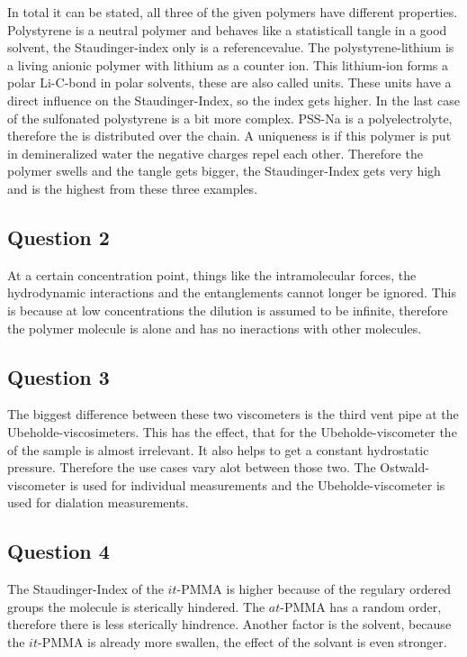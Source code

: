 \documentclass[10pt,a4paper,ngerman]{scrartcl}
\begin{document}
			In total it can be stated, all three of the given polymers have different properties.
			Polystyrene is a neutral polymer and behaves like a statisticall tangle in a good solvent, the Staudinger-index
			only is a referencevalue. The polystyrene-lithium is a living anionic polymer with lithium as a counter ion.
			This lithium-ion forms a polar Li-C-bond in polar solvents, these are also called units.
			These units have a direct influence on the Staudinger-Index, so the index gets higher.
			In the last case of the sulfonated polystyrene is a bit more complex. 
			PSS-Na is a polyelectrolyte, therefore the  is distributed over the chain. 
			A uniqueness is if this polymer is put in demineralized water the negative charges repel each other.
			Therefore the polymer swells and the tangle gets bigger, the Staudinger-Index gets very high and is the highest from these three examples.


		\subsection{Question 2}

			At a certain concentration point, things like the intramolecular forces, the hydrodynamic interactions and the entanglements cannot longer be ignored.
			This is because at low concentrations the dilution is assumed to be infinite, therefore the polymer molecule is alone and has no ineractions with other molecules.


		\subsection{Question 3}

			The biggest difference between these two viscometers is the third vent pipe at the Ubeholde-viscosimeters.
			This has the effect, that for the Ubeholde-viscometer the  of the sample is almost irrelevant.
			It also helps to get a constant hydrostatic pressure. 
			Therefore the use cases vary alot between those two. The Ostwald-viscometer is used for individual measurements and the Ubeholde-viscometer is used for dialation measurements.


		\subsection{Question 4}

			The Staudinger-Index of the $it$-PMMA is higher because of the regulary ordered groups the molecule is sterically hindered. 
			The $at$-PMMA has a random order, therefore there is less sterically hindrence.
			Another factor is the solvent, because the $it$-PMMA is already more swallen, the effect of the solvant is even stronger. 


		

\printbibliography
\end{document}
